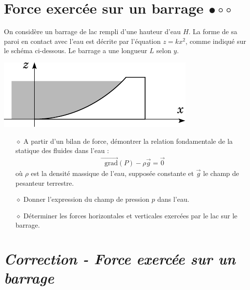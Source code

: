 \documentclass{report}
\newcommand*\grad{\mathop{}\!\mathrm{grad}}
\begin{document}
\section*{Force exercée sur un barrage $\bullet\circ\circ$}

On considère un barrage de lac rempli d'une hauteur d'eau $H$. La forme de sa paroi en contact avec l'eau est décrite par l'équation $z=kx^2$, comme indiqué sur le schéma ci-dessous. Le barrage a une longueur $L$ selon $y$.

\begin{center}
	\includegraphics[scale=1]{barrage.pdf}
\end{center}

\begin{itemize}

	\item[$\diamond$] A partir d'un bilan de force, démontrer la relation fondamentale de la statique des fluides dans l'eau : 
	\begin{align*}
		\vec{\grad}(P) - \rho\vec{g}=\vec{0}
	\end{align*}
		où $\rho$ est la densité massique de l'eau, supposée constante et $\vec{g}$ le champ de pesanteur terrestre.
		
		\item[$\diamond$] Donner l'expression du champ de pression $p$ dans l'eau.
		
		\item[$\diamond$] Déterminer les forces horizontales et verticales exercées par le lac sur le barrage.

\end{itemize}

\newpage

\section*{\textit{Correction - Force exercée sur un barrage}}
\end{document}
